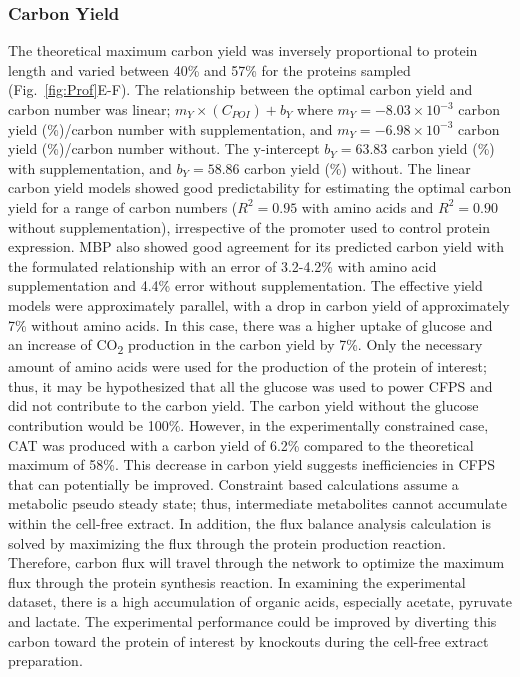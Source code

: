 \documentclass[journal=asbcd6,manuscript=article]{achemso}
\begin{document}
\subsubsection{Carbon Yield}
The theoretical maximum carbon yield was inversely proportional to protein length and varied between 40\% and 57\% for the proteins sampled (Fig.~\ref{fig:Prof}E-F).
The relationship between the optimal carbon yield and carbon number was linear; $m_{Y}\times(C_{POI})+b_{Y}$ where $m_{Y} =  -8.03\times10^{-3}$ carbon yield (\%)/carbon number with supplementation, and $m_{Y} = -6.98\times10^{-3}$ carbon yield (\%)/carbon number  without. The y-intercept $b_{Y} = 63.83$ carbon yield (\%) with supplementation, and $b_{Y} = 58.86$ carbon yield (\%) without.
The linear carbon yield models showed good predictability for estimating the optimal carbon yield for a range of carbon numbers ($R^{2} = 0.95$ with amino acids
and $R^{2} = 0.90$ without supplementation), irrespective of the promoter used to control protein expression.
MBP also showed good agreement for its predicted carbon yield with the formulated relationship with an error of 3.2-4.2\% with amino acid supplementation and 4.4\% error without supplementation.
The effective yield models were approximately parallel, with a drop in carbon yield of approximately 7\% without amino acids.
In this case, there was a higher uptake of glucose and an increase of CO\textsubscript{2} production in the carbon yield by 7\%.
Only the necessary amount of amino acids were used for the production of the protein of interest; thus, it may be hypothesized that all the glucose was used to power CFPS and did not contribute to the carbon yield.
The carbon yield without the glucose contribution would be 100\%.
However, in the experimentally constrained case, CAT was produced with a carbon yield of 6.2\% compared to the theoretical maximum of 58\%.
This decrease in carbon yield suggests inefficiencies in CFPS that can potentially be improved.
Constraint based calculations assume a metabolic pseudo steady state; thus, intermediate metabolites cannot accumulate within the cell-free extract.
In addition, the flux balance analysis calculation is solved by maximizing the flux through the protein production reaction.
Therefore, carbon flux will travel through the network to optimize the maximum flux through the protein synthesis reaction.
In examining the experimental dataset, there is a high accumulation of organic acids, especially acetate, pyruvate and lactate.
The experimental performance could be improved by diverting this carbon toward the protein of interest by knockouts during the cell-free extract preparation.
\end{document}
